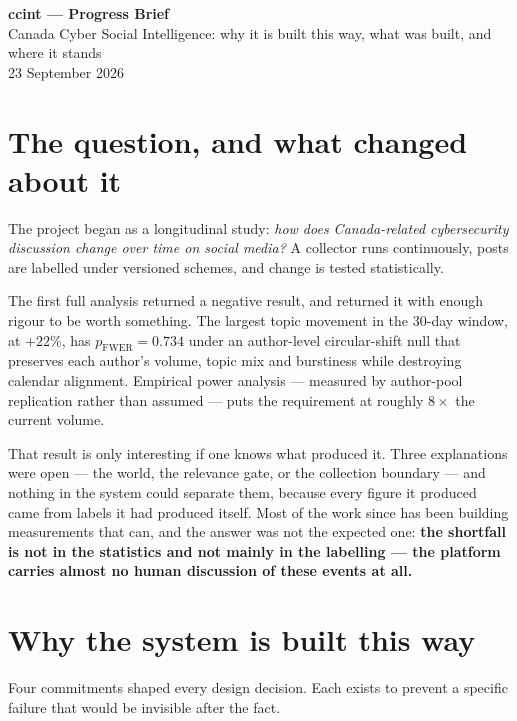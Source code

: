 \documentclass[11pt]{article}
\begin{document}
\thispagestyle{fancy}
\begin{center}
  \vspace{-0.9cm}
  {\LARGE\bfseries\color{accent}ccint --- Progress Brief}\\[4pt]
  {\large\color{ink} Canada Cyber Social Intelligence: why it is built this
   way, what was built, and where it stands}\\[6pt]
  {\normalsize\color{ink!70} 23 September 2026}
\end{center}
\vspace{0.2cm}

\section*{\color{accent}The question, and what changed about it}

The project began as a longitudinal study: \emph{how does Canada-related
cybersecurity discussion change over time on social media?} A collector runs
continuously, posts are labelled under versioned schemes, and change is tested
statistically.

The first full analysis returned a negative result, and returned it with enough
rigour to be worth something. The largest topic movement in the 30-day window,
 at $+22\%$, has $p_{\mathrm{FWER}} = 0.734$ under an
author-level circular-shift null that preserves each author's volume, topic mix
and burstiness while destroying calendar alignment. Empirical power analysis
--- measured by author-pool replication rather than assumed --- puts the
requirement at roughly $8\times$ the current volume.

That result is only interesting if one knows what produced it. Three
explanations were open --- the world, the relevance gate, or the collection
boundary --- and nothing in the system could separate them, because every
figure it produced came from labels it had produced itself. Most of the work
since has been building measurements that can, and the answer was not the
expected one: \textbf{the shortfall is not in the statistics and not mainly in
the labelling --- the platform carries almost no human discussion of these
events at all.}

\section*{\color{accent}Why the system is built this way}

Four commitments shaped every design decision. Each exists to prevent a
specific failure that would be invisible after the fact.
\end{document}
